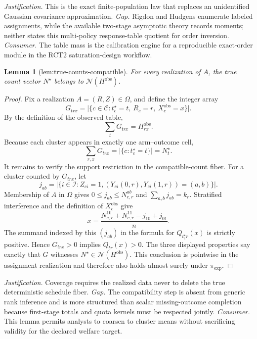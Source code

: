 \documentclass{article}
\newtheorem{lemma}{Lemma}
\begin{document}
\par\smallskip\noindent \textit{Justification.} This is the exact finite-population law that replaces an unidentified Gaussian covariance approximation. \textit{Gap.} Rigdon and Hudgens enumerate labeled assignments, while the available two-stage asymptotic theory records moments; neither states this multi-policy response-table quotient for order inversion. \textit{Consumer.} The table mass is the calibration engine for a reproducible exact-order module in the RCT2 saturation-design workflow.

\begin{lemma}[lem:true-counts-compatible]\label{lem:true-counts-compatible}
For every realization of \(A\), the true count vector \(N^\star\) belongs to \(\mathcal N(H^{\mathrm{obs}})\).
\end{lemma}
\begin{proof}
Fix a realization \(A=(R,Z)\in\Omega\), and define the integer array
\[
 G_{trx}=\bigl|\{c\in\mathcal C:t_c^\star=t,\ R_c=r,\ X_c^{\mathrm{obs}}=x\}\bigr|.
\]
By the definition of the observed table,
\[
 \sum_tG_{trx}=H_{rx}^{\mathrm{obs}}.
\]
Because each cluster appears in exactly one arm--outcome cell,
\[
 \sum_{r,x}G_{trx}=\bigl|\{c:t_c^\star=t\}\bigr|=N_t^\star.
\]
It remains to verify the support restriction in the compatible-count fiber.  For a cluster counted by \(G_{trx}\), let
\[
 j_{ab}=\bigl|\{i\in\mathcal I:Z_{ci}=1,
 (Y_{ci}(0,r),Y_{ci}(1,r))=(a,b)\}\bigr|.
\]
Membership of \(A\) in \(\Omega\) gives \(0\le j_{ab}\le N_{c,r}^{ab}\) and \(\sum_{a,b}j_{ab}=k_r\).  Stratified interference and the definition of \(X_c^{\mathrm{obs}}\) give
\[
 x=\frac{N_{c,r}^{10}+N_{c,r}^{11}-j_{10}+j_{01}}{n}.
\]
The summand indexed by this \((j_{ab})\) in the formula for \(Q_{t_c^\star r}(x)\) is strictly positive.  Hence \(G_{trx}>0\) implies \(Q_{tr}(x)>0\).  The three displayed properties say exactly that \(G\) witnesses \(N^\star\in\mathcal N(H^{\mathrm{obs}})\).  This conclusion is pointwise in the assignment realization and therefore also holds almost surely under \(\pi_{\exp}\).
\end{proof}
\par\smallskip\noindent \textit{Justification.} Coverage requires the realized data never to delete the true deterministic schedule fiber. \textit{Gap.} The compatibility step is absent from generic rank inference and is more structured than scalar missing-outcome completion because first-stage totals and quota kernels must be respected jointly. \textit{Consumer.} This lemma permits analysts to coarsen to cluster means without sacrificing validity for the declared welfare target.
\end{document}
